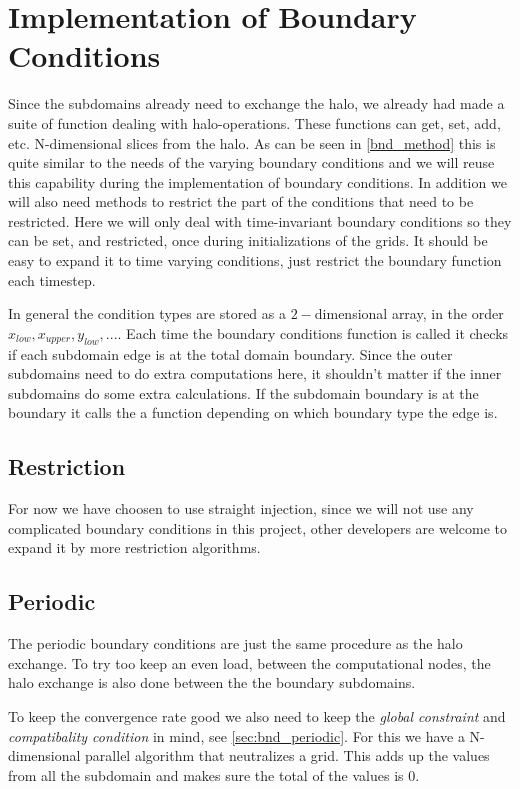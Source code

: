 \section{Implementation of Boundary Conditions}
    Since the subdomains already need to exchange the halo, we already had
    made a suite of function dealing with halo-operations. These functions
    can get, set, add, etc. N-dimensional slices from the halo. As can be seen in \cref{bnd_method}
    this is quite similar to the needs of the varying boundary conditions and we
    will reuse this capability during the implementation of boundary conditions.
    In addition we will also need methods to restrict the part of the conditions
    that need to be restricted. Here we will only deal with time-invariant boundary conditions
    so they can be set, and restricted, once during initializations of the grids.
    It should be easy to expand it to time varying conditions, just restrict the
    boundary function each timestep.

    In general the condition types are stored as a \(2-\)dimensional array, in the order
    \(x_{low}, x_{upper}, y_{low}, ...\). Each time the boundary conditions function
    is called it checks if each subdomain edge is at the total domain boundary.
    Since the outer subdomains need to do extra computations here, it shouldn't
    matter if the inner subdomains do some extra calculations. If the subdomain boundary
    is at the boundary it calls the a function depending on which boundary type
    the edge is.

    \subsection{Restriction}
        For now we have choosen to use straight injection, since we will not use any
        complicated boundary conditions in this project, other developers are welcome
        to expand it by more restriction algorithms.

    \subsection{Periodic}
        The periodic boundary conditions are just the same procedure as the halo
        exchange. To try too keep an even load, between the computational nodes,
        the halo exchange is also done between the the boundary subdomains.

        To keep the convergence rate good we also need to keep the \textit{global constraint}
        and \textit{compatibality condition} in mind, see \cref{sec:bnd_periodic}.
        For this we have a N-dimensional parallel algorithm that neutralizes a grid.
        This adds up the values from all the subdomain and makes sure the total of the values is \(0\).

